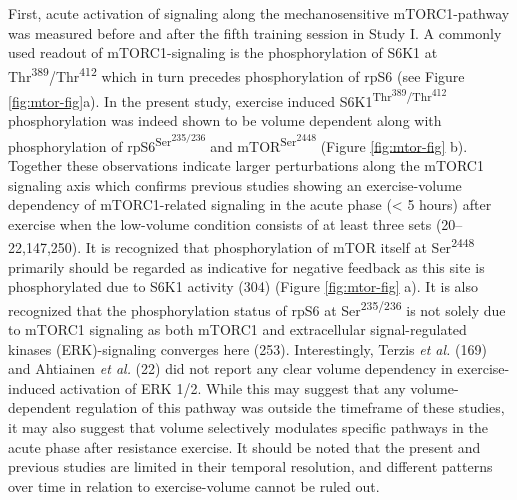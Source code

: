 \documentclass[twoside,10pt]{gihclass} %
\begin{document}
First, acute activation of signaling along the mechanosensitive mTORC1-pathway was measured before and after the fifth training session in Study I.
A commonly used readout of mTORC1-signaling is the phosphorylation of S6K1 at Thr\textsuperscript{389}/Thr\textsuperscript{412} which in turn precedes phosphorylation of rpS6 (see Figure \ref{fig:mtor-fig}a).
In the present study, exercise induced S6K1\textsuperscript{Thr\textsuperscript{389}/Thr\textsuperscript{412}} phosphorylation was indeed shown to be volume dependent along with phosphorylation of rpS6\textsuperscript{Ser\textsuperscript{235/236}} and mTOR\textsuperscript{Ser\textsuperscript{2448}} (Figure \ref{fig:mtor-fig} b).
Together these observations indicate larger perturbations along the mTORC1 signaling axis which confirms previous studies showing an exercise-volume dependency of mTORC1-related signaling in the acute phase (\textless{} 5 hours) after exercise when the low-volume condition consists of at least three sets
(20--22,147,250).
It is recognized that phosphorylation of mTOR itself at Ser\textsuperscript{2448} primarily should be regarded as indicative for negative feedback as this site is phosphorylated due to S6K1 activity
(304) (Figure \ref{fig:mtor-fig} a).
It is also recognized that the phosphorylation status of rpS6 at Ser\textsuperscript{235/236} is not solely due to mTORC1 signaling as both mTORC1 and extracellular signal-regulated kinases (ERK)-signaling converges here
(253).
Interestingly, Terzis \emph{et al.}
(169)
and Ahtiainen \emph{et al.}
(22)
did not report any clear volume dependency in exercise-induced activation of ERK 1/2.
While this may suggest that any volume-dependent regulation of this pathway was outside the timeframe of these studies, it may also suggest that volume selectively modulates specific pathways in the acute phase after resistance exercise.
It should be noted that the present and previous studies are limited in their temporal resolution, and different patterns over time in relation to exercise-volume cannot be ruled out.
\end{document}
